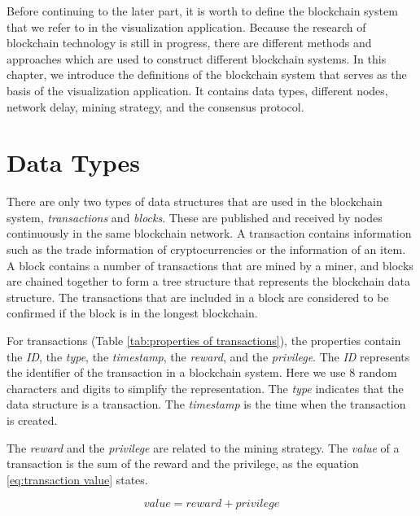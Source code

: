 Before continuing to the later part, it is worth to define the blockchain system that we refer to in the visualization application. Because the research of blockchain technology is still in progress, there are different methods and approaches which are used to construct different blockchain systems. In this chapter, we introduce the definitions of the blockchain system that serves as the basis of the visualization application. It contains data types, different nodes, network delay, mining strategy, and the consensus protocol.

\section{Data Types}

There are only two types of data structures that are used in the blockchain system, \textit{transactions} and \textit{blocks}. These are published and received by nodes continuously in the same blockchain network. A transaction contains information such as the trade information of cryptocurrencies or the information of an item. A block contains a number of transactions that are mined by a miner, and blocks are chained together to form a tree structure that represents the blockchain data structure. The transactions that are included in a block are considered to be confirmed if the block is in the longest blockchain.

For transactions (Table \ref{tab:properties of transactions}), the properties contain the \textit{ID}, the \textit{type}, the \textit{timestamp}, the \textit{reward}, and the \textit{privilege}. The \textit{ID} represents the identifier of the transaction in a blockchain system. Here we use 8 random characters and digits to simplify the representation. The \textit{type} indicates that the data structure is a transaction. The \textit{timestamp} is the time when the transaction is created. 

The \textit{reward} and the \textit{privilege} are related to the mining strategy. The \textit{value} of a transaction is the sum of the reward and the privilege, as the equation \ref{eq:transaction value} states.

\begin{equation} \label{eq:transaction value}
    value = reward + privilege
\end{equation}

\clearpage

